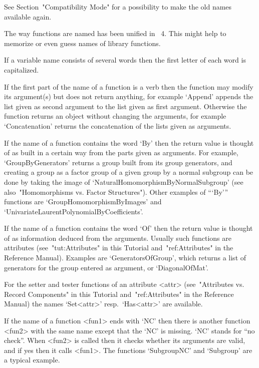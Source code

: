 See Section~"Compatibility Mode" for a possibility to make the old names
available again.



The way functions are named has been unified in {\GAP}~4.
This might help to memorize or even guess names of library functions.

If a variable name consists of several words then the first
letter of each word is capitalized.

If the first part of the name of a function is a verb then the function
may modify its argument(s) but does not return anything,
for example `Append' appends the list given as second argument to the
list given as first argument.
Otherwise the function returns an object without changing the arguments,
for example `Concatenation' returns the concatenation of the lists
given as arguments.

If the name of a function contains the word `By' then the return value is
thought of as built in a certain way from the parts given as arguments.
For example, `GroupByGenerators' returns a group built from its group
generators, and creating a group as a factor group of a given group
by a normal subgroup can be done by taking the image of
`NaturalHomomorphismByNormalSubgroup'
(see also~"Homomorphisms vs. Factor Structures").
Other examples of ```By''' functions are `GroupHomomorphismByImages' and
`UnivariateLaurentPolynomialByCoefficients'.

If the name of a function contains the word `Of' then the return value is
thought of as information deduced from the arguments.
Usually such functions are attributes
(see~"tut:Attributes" in this Tutorial and~"ref:Attributes"
in the Reference Manual).
Examples are `GeneratorsOfGroup', which returns a list of generators for
the group entered as argument, or `DiagonalOfMat'.

For the setter and tester functions of an attribute <attr>
(see~"Attributes vs. Record Components" in this Tutorial
and~"ref:Attributes" in the Reference Manual)
the names `Set<attr>' resp.~`Has<attr>' are available.

If the name of a function <fun1> ends with `NC' then there is another
function <fun2> with the same name except that the `NC' is missing.
`NC' stands for ``no check''.
When <fun2> is called then it checks whether its arguments are valid,
and if yes then it calls <fun1>.
The functions `SubgroupNC' and `Subgroup' are a typical example.

